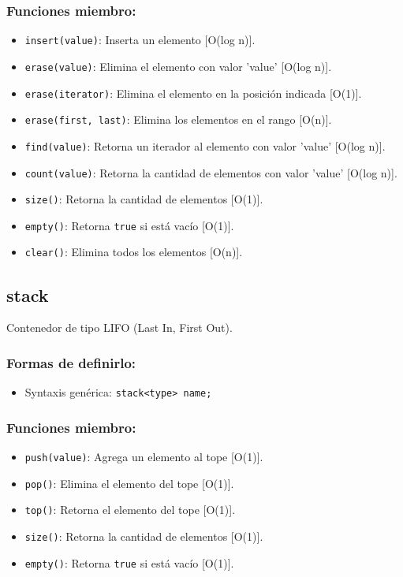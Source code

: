 \subsubsection{Funciones miembro:}
\begin{itemize}
  \item \texttt{insert(value)}: Inserta un elemento [O(log n)]. 
  \item \texttt{erase(value)}: Elimina el elemento con valor 'value' [O(log n)].
  \item \texttt{erase(iterator)}: Elimina el elemento en la posición indicada [O(1)].
  \item \texttt{erase(first, last)}: Elimina los elementos en el rango [O(n)].
  \item \texttt{find(value)}: Retorna un iterador al elemento con valor 'value' [O(log n)]. 
  \item \texttt{count(value)}: Retorna la cantidad de elementos con valor 'value' [O(log n)]. 
  \item \texttt{size()}: Retorna la cantidad de elementos [O(1)]. 
  \item \texttt{empty()}: Retorna \texttt{true} si está vacío [O(1)]. 
  \item \texttt{clear()}: Elimina todos los elementos [O(n)]. 
\end{itemize}

\subsection{stack}
\label{subsec:std_stack}
Contenedor de tipo LIFO (Last In, First Out). 

\subsubsection{Formas de definirlo:}
\begin{itemize}
  \item Syntaxis genérica: \texttt{stack<type> name;}
\end{itemize}

\subsubsection{Funciones miembro:}
\begin{itemize}
  \item \texttt{push(value)}: Agrega un elemento al tope [O(1)].
  \item \texttt{pop()}: Elimina el elemento del tope [O(1)].
  \item \texttt{top()}: Retorna el elemento del tope [O(1)].
  \item \texttt{size()}: Retorna la cantidad de elementos [O(1)].
  \item \texttt{empty()}: Retorna \texttt{true} si está vacío [O(1)]. 
\end{itemize}

